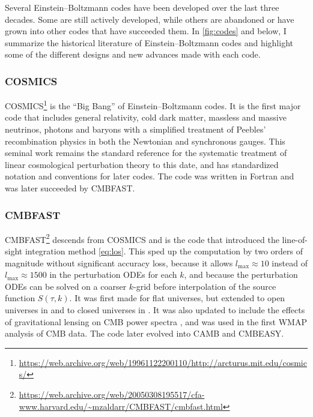 \documentclass[USenglish, thumbmarks]{uiophdthesis} %
\newcommand\EB{Einstein--Boltzmann}
\newcommand\lmax{{\ensuremath{l_\mathrm{max}}}}
\begin{document}
Several \EB{} codes have been developed over the last three decades.
Some are still actively developed,
while others are abandoned or
have grown into other codes that have succeeded them.
In \cref{fig:codes} and below, I summarize the historical literature of \EB{} codes
and highlight some of the different designs and new advances made with each code.

\subsubsection{COSMICS}
COSMICS\footnote{\url{https://web.archive.org/web/19961122200110/http://arcturus.mit.edu/cosmics/}} \cite{maCosmologicalPerturbationTheory1995a,bertschingerCOSMICSCosmologicalInitial1995}
is the \enquote{Big Bang} of \EB{} codes.
It is the first major code
that includes general relativity, cold dark matter, massless and massive neutrinos, photons and baryons with a simplified treatment of Peebles' recombination physics
in both the Newtonian and synchronous gauges.
This seminal work remains the standard reference for the systematic treatment of linear cosmological perturbation theory to this date,
and has standardized notation and conventions for later codes.
The code was written in Fortran and was later succeeded by CMBFAST.

\subsubsection{CMBFAST}
CMBFAST\footnote{\url{https://web.archive.org/web/20050308195517/cfa-www.harvard.edu/~mzaldarr/CMBFAST/cmbfast.html}} \cite{seljakLineSightApproach1996}
descends from COSMICS and is the code that introduced the line-of-sight integration method \eqref{eq:los}.
This sped up the computation by two orders of magnitude without significant accuracy loss,
because it allows $\lmax \approx 10$ instead of $\lmax \approx 1500$ in the perturbation ODEs for each $k$,
and because the perturbation ODEs can be solved on a coarser $k$-grid before interpolation of the source function $S(\tau, k)$.
It was first made for flat universes,
but extended to open universes in \cite{zaldarriagaIntegralSolutionMicrowave1998}
and to closed universes in \cite{zaldarriagaCMBFASTSpatiallyClosed2000}.
It was also updated to include the effects of gravitational lensing on CMB power spectra \cite{zaldarriagaGravitationalLensingEffect1998},
and was used in the first WMAP analysis \cite{verdeFirstYearWilkinson2003,spergelFirstYearWilkinson2003} of CMB data.
The code later evolved into CAMB and CMBEASY.
\end{document}
